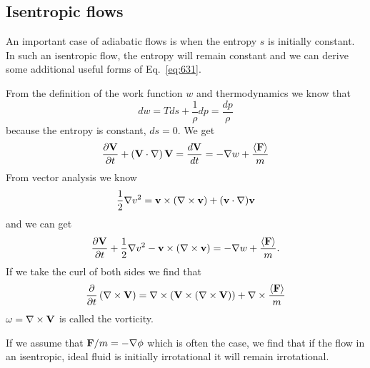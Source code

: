 \subsection{Isentropic flows}
\label{sec:isentropic-flows}

An important case of adiabatic flows is when the entropy $s$ is
initially constant.  In such an isentropic flow, the entropy will
remain constant and we can derive some additional useful forms of
Eq.~\ref{eq:631}.

From the definition of the work function $w$ and thermodynamics we
know that
\begin{equation}
d w = T ds + \frac{1}{\rho} dp = \frac{dp}{\rho}
\label{eq:635}
\end{equation}
because the entropy is constant, $ds=0$.  We get
\begin{equation}
\frac{\partial {{\bf V}}}{\partial {t}} + \left ( {\bf V} \cdot \nabla \right ) {\bf V} =
\frac{d {\bf V}}{d {t}} = -\nabla w + \frac{\langle {\bf F} \rangle}{m}
\label{eq:636}
\end{equation}
From vector analysis we know
\begin{equation}
\frac{1}{2} \nabla v^2 = {\bf v} \times (\nabla \times {\bf v}) + ({\bf
  v} \cdot \nabla ) {\bf v}
\label{eq:637}
\end{equation}
and we can get
\begin{equation}
\frac{\partial {{\bf V}}}{\partial {t}} + \frac{1}{2} \nabla v^2 - {\bf v} \times (\nabla
\times {\bf v} ) = -\nabla w + \frac{\langle {\bf F} \rangle}{m}.
\label{eq:638}
\end{equation}
If we take the curl of both sides we find that
\begin{equation}
\frac{\partial {}}{\partial {t}}\left ( \nabla \times {\bf V} \right ) = \nabla \times \left( {\bf V}
\times (\nabla \times {\bf V} ) \right ) + \nabla \times \frac{\langle
  {\bf F} \rangle }{m}
\label{eq:639}
\end{equation}
$\omega = \nabla \times {\bf V}$ is called the vorticity.

If we assume that ${\bf F}/m = -\nabla \phi$ which is often the case,
we find that if the flow in an isentropic, ideal fluid is initially
irrotational it will remain irrotational.


